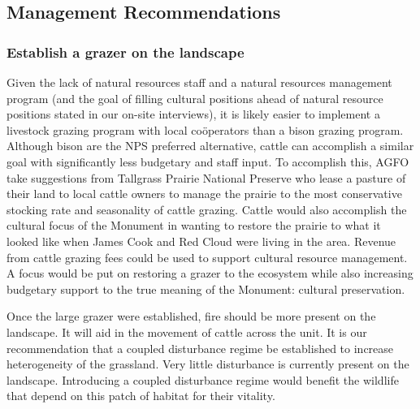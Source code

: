\subsection{Management Recommendations}

\subsubsection{Establish a grazer on the landscape}

Given the lack of natural resources staff and a natural resources management program (and the goal of filling cultural positions ahead of natural resource positions stated in our on-site interviews), it is likely easier to implement a livestock grazing program with local co\"{o}perators than a bison grazing program. 
Although bison are the NPS preferred alternative, cattle can accomplish a similar goal with significantly less budgetary and staff input. 
To accomplish this, AGFO take suggestions from Tallgrass Prairie National Preserve who lease a pasture of their land to local cattle owners to manage the prairie to the most conservative stocking rate and seasonality of cattle grazing.
Cattle would also accomplish the cultural focus of the Monument in wanting to restore the prairie to what it looked like when James Cook and Red Cloud were living in the area.
Revenue from cattle grazing fees could be used to support cultural resource management. 
A focus would be put on restoring a grazer to the ecosystem while also increasing budgetary support to the true meaning of the Monument: cultural preservation.

Once the large grazer were established, fire should be more present on the landscape. 
It will aid in the movement of cattle across the unit. 
It is our recommendation that a coupled disturbance regime be established to increase heterogeneity of the grassland. 
Very little disturbance is currently present on the landscape. 
Introducing a coupled disturbance regime would benefit the wildlife that depend on this patch of habitat for their vitality.
